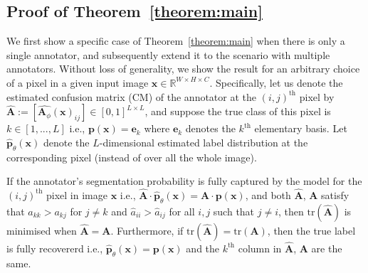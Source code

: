 \subsection{Proof of Theorem~\ref{theorem:main}}

We first show a specific case of Theorem~\ref{theorem:main} when there is only a single annotator, and subsequently extend it to the scenario with multiple annotators. Without loss of generality, we show the result for an arbitrary choice of a pixel in a given input image $\mathbf{x} \in \mathbb{R}^{W\times H \times C}$. Specifically, let us denote the estimated confusion matrix (CM) of the annotator at the $(i, j)^{\text{th}}$ pixel by $\hat{\textbf{A}} := [\hat{\textbf{A}_\phi}(\mathbf{x})_{ij}] \in [0, 1]^{L\times L}$, and suppose the true class of this pixel is $k \in [1, ...,L]$ i.e., $\textbf{p}(\textbf{x}) = \mathbf{e}_k$ where $\mathbf{e}_k$ denotes the $k^{\text{th}}$ elementary basis. Let $\hat{\textbf{p}}_\theta(\textbf{x})$ denote the $L$-dimensional estimated label distribution at the corresponding pixel (instead of over all the whole image). 
\vspace{3mm}
\begin{lemma}\label{lemma:1}
  If the annotator's segmentation probability is fully captured by the model for the $(i, j)^{\text{th}}$ pixel in image $\mathbf{x}$ i.e., $\hat{\textbf{A}}\cdot \hat{\textbf{p}}_\theta(\textbf{x})=\textbf{A}\cdot \textbf{p}(\textbf{x}) $, and both $\hat{\textbf{A}}$, $\textbf{A}$ satisfy that $a_{kk} > a_{kj}$ for $j \neq k$ and $\hat{a}_{ii} > \hat{a}_{ij}$ for all $i, j$ such that $j \neq i$, then $\text{tr}(\hat{\textbf{A}})$ is minimised when $\hat{\textbf{A}}=\textbf{A}$. Furthermore, if $\text{tr}(\hat{\textbf{A}})=\text{tr}(\textbf{A})$, then the true label is fully recovererd i.e., $ \hat{\textbf{p}}_\theta(\textbf{x}) = \textbf{p}(\textbf{x})$ and the $k^{\text{th}}$ column in $\hat{\textbf{A}}$, $\textbf{A}$ are the same. 
  
\end{lemma}

